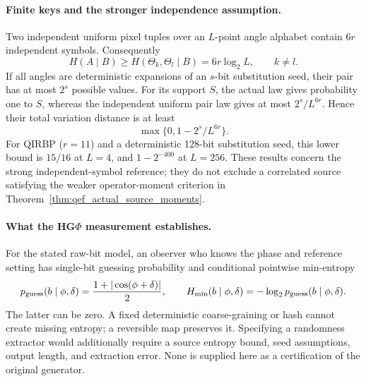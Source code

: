 \documentclass[11pt,a4paper]{article}
\begin{document}
{{\paragraph{Finite keys and the stronger independence assumption.}
Two independent uniform pixel tuples over an $L$-point angle alphabet
contain $6r$ independent symbols. Consequently
\begin{equation}
 H(A\mid B)\geq H(\Theta_k,\Theta_l\mid B)=6r\log_2L,
 \qquad k\ne l.
 \label{eq:qef_source_entropy_requirement}
\end{equation}
If all angles are deterministic expansions of an $s$-bit substitution
seed, their pair has at most $2^s$ possible values. For its support $S$,
the actual law gives probability one to $S$, whereas the independent
uniform pair law gives at most $2^s/L^{6r}$. Hence their total variation
distance is at least
\begin{equation}
 \max\{0,1-2^s/L^{6r}\}.
 \label{eq:qef_source_support_obstruction}
\end{equation}
For QIRBP ($r=11$) and a deterministic 128-bit substitution seed, this
lower bound is $15/16$ at $L=4$, and $1-2^{-400}$ at $L=256$.
These results concern the strong independent-symbol reference; they do
not exclude a correlated source satisfying the weaker operator-moment
criterion in Theorem~\ref{thm:qef_actual_source_moments}.

\paragraph{What the HG$\Phi$ measurement establishes.}
For the stated raw-bit model, an observer who knows the phase and
reference setting has single-bit guessing probability and conditional
pointwise min-entropy
\begin{equation}
 p_{\rm guess}(b\mid\phi,\delta)
 =\frac{1+|\cos(\phi+\delta)|}{2},\qquad
 H_{\min}(b\mid\phi,\delta)
 =-\log_2p_{\rm guess}(b\mid\phi,\delta).
 \label{eq:qef_raw_bit_source_entropy}
\end{equation}
The latter can be zero. A fixed deterministic coarse-graining or hash
cannot create missing entropy; a reversible map preserves it. Specifying
a randomness extractor would additionally require a source entropy
bound, seed assumptions, output length, and extraction error. None is
supplied here as a certification of the original generator.

}}
\end{document}
